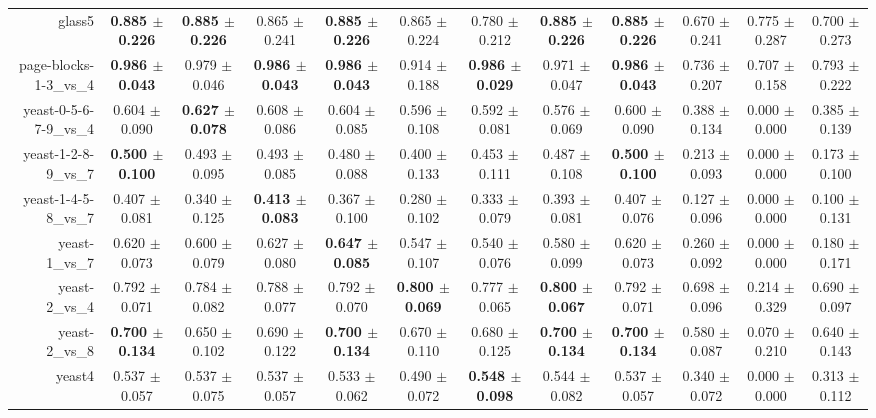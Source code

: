 \begin{table}[!ht]
{\begin{tabular}{r c c c c c c c c c c c}
glass5 & \textbf{0.885 $\pm$ 0.226} & \textbf{0.885 $\pm$ 0.226} & 0.865 $\pm$ 0.241 & \textbf{0.885 $\pm$ 0.226} & 0.865 $\pm$ 0.224 & 0.780 $\pm$ 0.212 & \textbf{0.885 $\pm$ 0.226} & \textbf{0.885 $\pm$ 0.226} & 0.670 $\pm$ 0.241 & 0.775 $\pm$ 0.287 & 0.700 $\pm$ 0.273 \\
page-blocks-1-3\_vs\_4 & \textbf{0.986 $\pm$ 0.043} & 0.979 $\pm$ 0.046 & \textbf{0.986 $\pm$ 0.043} & \textbf{0.986 $\pm$ 0.043} & 0.914 $\pm$ 0.188 & \textbf{0.986 $\pm$ 0.029} & 0.971 $\pm$ 0.047 & \textbf{0.986 $\pm$ 0.043} & 0.736 $\pm$ 0.207 & 0.707 $\pm$ 0.158 & 0.793 $\pm$ 0.222 \\
yeast-0-5-6-7-9\_vs\_4 & 0.604 $\pm$ 0.090 & \textbf{0.627 $\pm$ 0.078} & 0.608 $\pm$ 0.086 & 0.604 $\pm$ 0.085 & 0.596 $\pm$ 0.108 & 0.592 $\pm$ 0.081 & 0.576 $\pm$ 0.069 & 0.600 $\pm$ 0.090 & 0.388 $\pm$ 0.134 & 0.000 $\pm$ 0.000 & 0.385 $\pm$ 0.139 \\
yeast-1-2-8-9\_vs\_7 & \textbf{0.500 $\pm$ 0.100} & 0.493 $\pm$ 0.095 & 0.493 $\pm$ 0.085 & 0.480 $\pm$ 0.088 & 0.400 $\pm$ 0.133 & 0.453 $\pm$ 0.111 & 0.487 $\pm$ 0.108 & \textbf{0.500 $\pm$ 0.100} & 0.213 $\pm$ 0.093 & 0.000 $\pm$ 0.000 & 0.173 $\pm$ 0.100 \\
yeast-1-4-5-8\_vs\_7 & 0.407 $\pm$ 0.081 & 0.340 $\pm$ 0.125 & \textbf{0.413 $\pm$ 0.083} & 0.367 $\pm$ 0.100 & 0.280 $\pm$ 0.102 & 0.333 $\pm$ 0.079 & 0.393 $\pm$ 0.081 & 0.407 $\pm$ 0.076 & 0.127 $\pm$ 0.096 & 0.000 $\pm$ 0.000 & 0.100 $\pm$ 0.131 \\
yeast-1\_vs\_7 & 0.620 $\pm$ 0.073 & 0.600 $\pm$ 0.079 & 0.627 $\pm$ 0.080 & \textbf{0.647 $\pm$ 0.085} & 0.547 $\pm$ 0.107 & 0.540 $\pm$ 0.076 & 0.580 $\pm$ 0.099 & 0.620 $\pm$ 0.073 & 0.260 $\pm$ 0.092 & 0.000 $\pm$ 0.000 & 0.180 $\pm$ 0.171 \\
yeast-2\_vs\_4 & 0.792 $\pm$ 0.071 & 0.784 $\pm$ 0.082 & 0.788 $\pm$ 0.077 & 0.792 $\pm$ 0.070 & \textbf{0.800 $\pm$ 0.069} & 0.777 $\pm$ 0.065 & \textbf{0.800 $\pm$ 0.067} & 0.792 $\pm$ 0.071 & 0.698 $\pm$ 0.096 & 0.214 $\pm$ 0.329 & 0.690 $\pm$ 0.097 \\
yeast-2\_vs\_8 & \textbf{0.700 $\pm$ 0.134} & 0.650 $\pm$ 0.102 & 0.690 $\pm$ 0.122 & \textbf{0.700 $\pm$ 0.134} & 0.670 $\pm$ 0.110 & 0.680 $\pm$ 0.125 & \textbf{0.700 $\pm$ 0.134} & \textbf{0.700 $\pm$ 0.134} & 0.580 $\pm$ 0.087 & 0.070 $\pm$ 0.210 & 0.640 $\pm$ 0.143 \\
yeast4 & 0.537 $\pm$ 0.057 & 0.537 $\pm$ 0.075 & 0.537 $\pm$ 0.057 & 0.533 $\pm$ 0.062 & 0.490 $\pm$ 0.072 & \textbf{0.548 $\pm$ 0.098} & 0.544 $\pm$ 0.082 & 0.537 $\pm$ 0.057 & 0.340 $\pm$ 0.072 & 0.000 $\pm$ 0.000 & 0.313 $\pm$ 0.112 \\

\end{tabular}}
\end{table}
